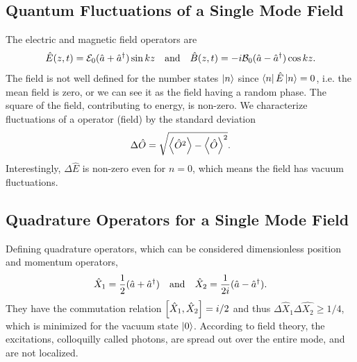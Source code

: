 \subsection{Quantum Fluctuations of a Single Mode Field}
The electric and magnetic field operators are
\begin{equation}
    \hat{E}(z, t) = \mathcal{E}_0 (\hat{a} + \hat{a}^\dagger)\sin kz \quad\text{and}\quad \hat{B}(z,t) = -i\mathcal{B}_0 (\hat{a} - \hat{a}^\dagger)\cos kz.
\end{equation}
The field is not well defined for the number states $\ket{n}$ since $\bra{n}\hat{E} \ket{n} = 0$, i.e. the mean field is zero, or we can see it as the field having a random phase. The square of the field, contributing to energy, is non-zero. We characterize fluctuations of a operator (field) by the standard deviation 
\begin{equation}
    \Delta \hat{O} = \sqrt{\expval{\hat{O}^2} - \expval{\hat{O}}^2}.
\end{equation}
Interestingly, $\Delta \hat{E}$ is non-zero even for $n=0$, which means the field has vacuum fluctuations. 

\subsection{Quadrature Operators for a Single Mode Field}
Defining quadrature operators, which can be considered dimensionless position and momentum operators, 
\begin{equation}
    \hat{X}_1 = \frac{1}{2}(\hat{a} + \hat{a}^\dagger) \quad\text{and}\quad \hat{X}_2 = \frac{1}{2i} (\hat{a} - \hat{a}^\dagger).
\end{equation}
They have the commutation relation $\comm{\hat{X}_1}{\hat{X}_2} = i/2$ and thus $\Delta \hat{X}_1 \Delta \hat{X_2} \geq 1/4$, which is minimized for the vacuum state $\ket{0}$. According to field theory, the excitations, colloquilly called photons, are spread out over the entire mode, and are not localized. 

